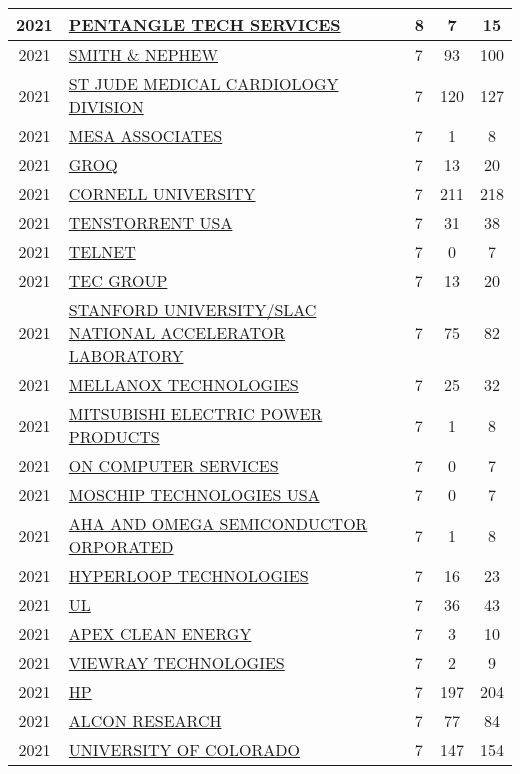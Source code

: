 \documentclass{article}%
\begin{document}
\begin{longtable}{c|p{20em}|p{5em}|c|c}
\hline%
2021&\hyperref[subsec:PENTANGLETECHSERVICES]{PENTANGLE TECH SERVICES}&8&7&15\\%
\hline%
2021&\hyperref[subsec:SMITHNEPHEW]{SMITH \& NEPHEW}&7&93&100\\%
\hline%
2021&\hyperref[subsec:STJUDEMEDICALCARDIOLOGYDIVISION]{ST JUDE MEDICAL CARDIOLOGY DIVISION}&7&120&127\\%
\hline%
2021&\hyperref[subsec:MESAASSOCIATES]{MESA ASSOCIATES}&7&1&8\\%
\hline%
2021&\hyperref[subsec:GROQ]{GROQ}&7&13&20\\%
\hline%
2021&\hyperref[subsec:CORNELLUNIVERSITY]{CORNELL UNIVERSITY}&7&211&218\\%
\hline%
2021&\hyperref[subsec:TENSTORRENTUSA]{TENSTORRENT USA}&7&31&38\\%
\hline%
2021&\hyperref[subsec:TELNET]{TELNET}&7&0&7\\%
\hline%
2021&\hyperref[subsec:TECGROUP]{TEC GROUP}&7&13&20\\%
\hline%
2021&\hyperref[subsec:STANFORDUNIVERSITY/SLACNATIONALACCELERATORLABORATORY]{STANFORD UNIVERSITY/SLAC NATIONAL ACCELERATOR LABORATORY}&7&75&82\\%
\hline%
2021&\hyperref[subsec:MELLANOXTECHNOLOGIES]{MELLANOX TECHNOLOGIES}&7&25&32\\%
\hline%
2021&\hyperref[subsec:MITSUBISHIELECTRICPOWERPRODUCTS]{MITSUBISHI ELECTRIC POWER PRODUCTS}&7&1&8\\%
\hline%
2021&\hyperref[subsec:ONCOMPUTERSERVICES]{ON COMPUTER SERVICES}&7&0&7\\%
\hline%
2021&\hyperref[subsec:MOSCHIPTECHNOLOGIESUSA]{MOSCHIP TECHNOLOGIES USA}&7&0&7\\%
\hline%
2021&\hyperref[subsec:AHAANDOMEGASEMICONDUCTORORPORATED]{AHA AND OMEGA SEMICONDUCTOR ORPORATED}&7&1&8\\%
\hline%
2021&\hyperref[subsec:HYPERLOOPTECHNOLOGIES]{HYPERLOOP TECHNOLOGIES}&7&16&23\\%
\hline%
2021&\hyperref[subsec:UL]{UL}&7&36&43\\%
\hline%
2021&\hyperref[subsec:APEXCLEANENERGY]{APEX CLEAN ENERGY}&7&3&10\\%
\hline%
2021&\hyperref[subsec:VIEWRAYTECHNOLOGIES]{VIEWRAY TECHNOLOGIES}&7&2&9\\%
\hline%
2021&\hyperref[subsec:HP]{HP}&7&197&204\\%
\hline%
2021&\hyperref[subsec:ALCONRESEARCH]{ALCON RESEARCH}&7&77&84\\%
\hline%
2021&\hyperref[subsec:UNIVERSITYOFCOLORADO]{UNIVERSITY OF COLORADO}&7&147&154\\%

\end{longtable}
\end{document}

